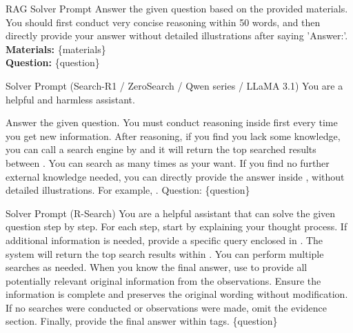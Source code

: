\begin{examplebox}{RAG Solver Prompt}
    Answer the given question based on the provided materials. You should first conduct very concise reasoning within 50 words, and then directly provide your answer without detailed illustrations after saying 'Answer:'. \\
    
    \textbf{Materials: }\{materials\}\\
    
    \textbf{Question: }\{question\}
\end{examplebox}

\begin{examplebox}{Solver Prompt (Search-R1 / ZeroSearch / Qwen series / LLaMA 3.1)}
    You are a helpful and harmless assistant. 
    
    Answer the given question. You must conduct reasoning inside  first every time you get new information. After reasoning, if you find you lack some knowledge, you can call a search engine by  and it will return the top searched results between . You can search as many times as your want. If you find no further external knowledge needed, you can directly provide the answer inside , without detailed illustrations. For example, . Question: \{question\}
\end{examplebox}

\begin{examplebox}{Solver Prompt (R-Search)}
    You are a helpful assistant that can solve the given question step by step. For each step, start by explaining your thought process. If additional information is needed, provide a specific query enclosed in . The system will return the top search results within . You can perform multiple searches as needed. When you know the final answer, use  to provide all potentially relevant original information from the observations. Ensure the information is complete and preserves the original wording without modification. If no searches were conducted or observations were made, omit the evidence section. Finally, provide the final answer within  tags. \{question\}
\end{examplebox}


